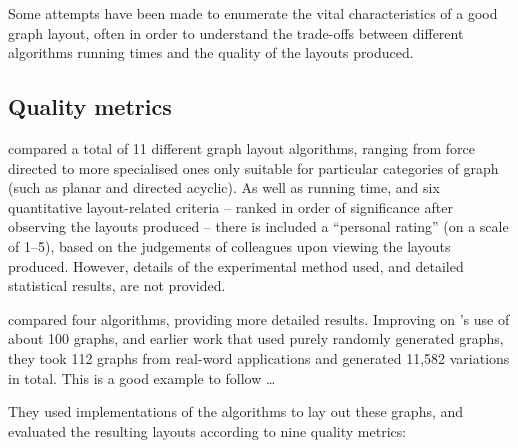 Some attempts have been made to enumerate the vital characteristics of a good graph layout, often in order to understand the trade-offs between different algorithms running times and the quality of the layouts produced.


\subsection{Quality metrics}

\citet{Himsolt95comparingand} compared a total of 11 different graph layout algorithms, ranging from force directed to more specialised ones only suitable for particular categories of graph (such as planar and directed acyclic).
As well as running time, and six quantitative layout-related criteria -- ranked in order of significance after observing the layouts produced -- there is included a ``personal rating'' (on a scale of 1--5), based on the judgements of colleagues upon viewing the layouts produced.
However, details of the experimental method used, and detailed statistical results, are not provided.

\citet{DiBattista1997303} compared four algorithms, providing more detailed results.
Improving on \citeauthor{Himsolt95comparingand}'s use of about 100 graphs, and earlier work  that used purely randomly generated graphs, they took 112 graphs from real-word applications and generated 11,582 variations in total. This is a good example to follow \ldots

They used implementations of the algorithms to lay out these graphs, and evaluated the resulting layouts according to nine quality metrics:

